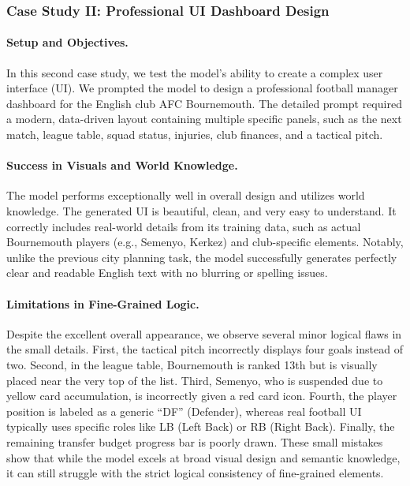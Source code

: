 \documentclass{llmxive}
\begin{document}
\subsubsection{Case Study II: Professional UI Dashboard Design}
\paragraph{Setup and Objectives.} 
In this second case study, we test the model's ability to create a complex user interface (UI). We prompted the model to design a professional football manager dashboard for the English club AFC Bournemouth. The detailed prompt required a modern, data-driven layout containing multiple specific panels, such as the next match, league table, squad status, injuries, club finances, and a tactical pitch. 
\paragraph{Success in Visuals and World Knowledge.} 
The model performs exceptionally well in overall design and utilizes world knowledge. The generated UI is beautiful, clean, and very easy to understand. It correctly includes real-world details from its training data, such as actual Bournemouth players (e.g., Semenyo, Kerkez) and club-specific elements. Notably, unlike the previous city planning task, the model successfully generates perfectly clear and readable English text with no blurring or spelling issues.
\paragraph{Limitations in Fine-Grained Logic.} 
Despite the excellent overall appearance, we observe several minor logical flaws in the small details. First, the tactical pitch incorrectly displays four goals instead of two. Second, in the league table, Bournemouth is ranked 13th but is visually placed near the very top of the list. Third, Semenyo, who is suspended due to yellow card accumulation, is incorrectly given a red card icon. Fourth, the player position is labeled as a generic ``DF'' (Defender), whereas real football UI typically uses specific roles like LB (Left Back) or RB (Right Back). Finally, the remaining transfer budget progress bar is poorly drawn. These small mistakes show that while the model excels at broad visual design and semantic knowledge, it can still struggle with the strict logical consistency of fine-grained elements.
\end{document}
